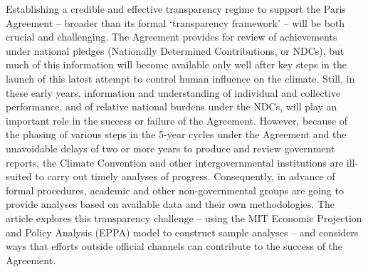 Establishing a credible and effective transparency regime to support the Paris Agreement – broader than its formal ‘transparency framework’ – will be both crucial and challenging. The Agreement provides for review of achievements under national pledges (Nationally Determined Contributions, or NDCs), but much of this information will become available only well after key steps in the launch of this latest attempt to control human influence on the climate. Still, in these early years, information and understanding of individual and collective performance, and of relative national burdens under the NDCs, will play an important role in the success or failure of the Agreement. However, because of the phasing of various steps in the 5-year cycles under the Agreement and the unavoidable delays of two or more years to produce and review government reports, the Climate Convention and other intergovernmental institutions are ill-suited to carry out timely analyses of progress. Consequently, in advance of formal procedures, academic and other non-governmental groups are going to provide analyses based on available data and their own methodologies. The article explores this transparency challenge – using the MIT Economic Projection and Policy Analysis (EPPA) model to construct sample analyses – and considers ways that efforts outside official channels can contribute to the success of the Agreement.